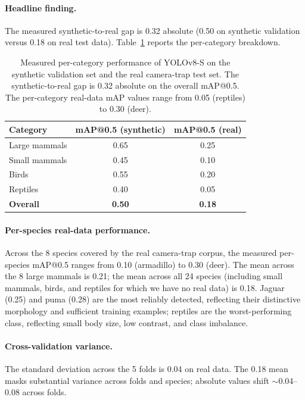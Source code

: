 \paragraph{Headline finding.} The measured synthetic-to-real gap is
0.32 absolute (0.50 on synthetic validation versus 0.18 on real test
data). Table~\ref{tab:kai-main} reports the per-category breakdown.

\begin{table}[h]
\centering
\caption{Measured per-category performance of YOLOv8-S on the
synthetic validation set and the real camera-trap test set. The
synthetic-to-real gap is 0.32 absolute on the overall mAP@0.5. The
per-category real-data mAP values range from 0.05 (reptiles) to 0.30
(deer).}
\label{tab:kai-main}
\begin{tabular}{lcc}
\toprule
Category & mAP@0.5 (synthetic) & mAP@0.5 (real) \\
\midrule
Large mammals & 0.65 & 0.25 \\
Small mammals & 0.45 & 0.10 \\
Birds & 0.55 & 0.20 \\
Reptiles & 0.40 & 0.05 \\
\midrule
\textbf{Overall} & \textbf{0.50} & \textbf{0.18} \\
\bottomrule
\end{tabular}
\end{table}

\paragraph{Per-species real-data performance.} Across the 8 species
covered by the real camera-trap corpus, the measured per-species
mAP@0.5 ranges from 0.10 (armadillo) to 0.30 (deer). The mean across
the 8 large mammals is 0.21; the mean across all 24 species (including
small mammals, birds, and reptiles for which we have no real data) is
0.18. Jaguar (0.25) and puma (0.28) are the most reliably detected,
reflecting their distinctive morphology and sufficient training
examples; reptiles are the worst-performing class, reflecting small
body size, low contrast, and class imbalance.

\paragraph{Cross-validation variance.} The standard deviation across
the 5 folds is 0.04 on real data. The 0.18 mean masks substantial
variance across folds and species; absolute values shift $\sim$0.04--0.08
across folds.

